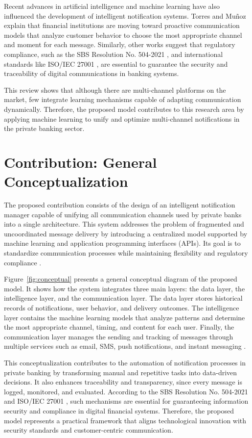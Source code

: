 \documentclass[conference]{IEEEtran}
\begin{document}
Recent advances in artificial intelligence and machine learning have also influenced the development of intelligent notification systems. Torres and Muñoz \cite{torres2020} explain that financial institutions are moving toward proactive communication models that analyze customer behavior to choose the most appropriate channel and moment for each message. Similarly, other works suggest that regulatory compliance, such as the SBS Resolution No. 504-2021 \cite{sbs2021}, and international standards like ISO/IEC 27001 \cite{iso27001}, are essential to guarantee the security and traceability of digital communications in banking systems.

This review shows that although there are multi-channel platforms on the market, few integrate learning mechanisms capable of adapting communication dynamically. Therefore, the proposed model contributes to this research area by applying machine learning to unify and optimize multi-channel notifications in the private banking sector.

\section{Contribution: General Conceptualization}

The proposed contribution consists of the design of an intelligent notification manager capable of unifying all communication channels used by private banks into a single architecture. This system addresses the problem of fragmented and uncoordinated message delivery by introducing a centralized model supported by machine learning and application programming interfaces (APIs). Its goal is to standardize communication processes while maintaining flexibility and regulatory compliance \cite{rahimi2021,torres2020}.

Figure~\ref{fig:conceptual} presents a general conceptual diagram of the proposed model. It shows how the system integrates three main layers: the data layer, the intelligence layer, and the communication layer. The data layer stores historical records of notifications, user behavior, and delivery outcomes. The intelligence layer contains the machine learning models that analyze patterns and determine the most appropriate channel, timing, and content for each user. Finally, the communication layer manages the sending and tracking of messages through multiple services such as email, SMS, push notifications, and instant messaging \cite{liang2011}.

This conceptualization contributes to the automation of notification processes in private banking by transforming manual and repetitive tasks into data-driven decisions. It also enhances traceability and transparency, since every message is logged, monitored, and evaluated. According to the SBS Resolution No. 504-2021 \cite{sbs2021} and ISO/IEC 27001 \cite{iso27001}, such mechanisms are essential for guaranteeing information security and compliance in digital financial systems. Therefore, the proposed model represents a practical framework that aligns technological innovation with security standards and customer-centric communication.
\end{document}
